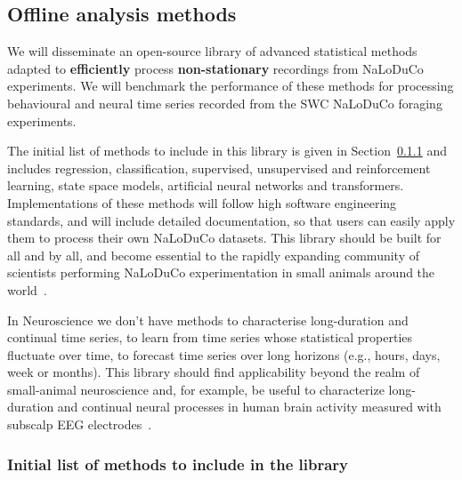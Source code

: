 \documentclass[12pt]{article}
\begin{document}
\subsection{Offline analysis methods}
\label{sec:offlineAnalysisMethods}

We will disseminate an open-source library of advanced statistical methods
adapted to \textbf{efficiently} process \textbf{non-stationary} recordings from
NaLoDuCo experiments.
%
We will benchmark the performance of these methods for processing behavioural
and neural time series recorded from the SWC NaLoDuCo foraging experiments.

The initial list of methods to include in this library is given in
Section~\ref{sec:initialListOfMethods} and includes regression, classification,
supervised, unsupervised and reinforcement learning, state space models,
artificial neural networks and transformers.
%
Implementations of these methods will follow high software engineering
standards, and will include detailed documentation, so that users can easily
apply them to process their own NaLoDuCo datasets.
%
%
This library should be built for all and by all, and become essential to the
rapidly expanding community of scientists performing NaLoDuCo experimentation
in small animals around the world~\citep{}.

In Neuroscience we don't have methods to characterise long-duration and
continual time series, to learn from time series whose statistical properties
fluctuate over time, to forecast time series over long horizons (e.g., hours,
days, week or months).
%
This library should find applicability beyond the realm of small-animal
neuroscience and, for example, be useful to characterize long-duration and
continual neural processes in human brain activity measured with subscalp EEG
electrodes~\citep{}.

\subsubsection{Initial list of methods to include in the library}
\label{sec:initialListOfMethods}
\end{document}

